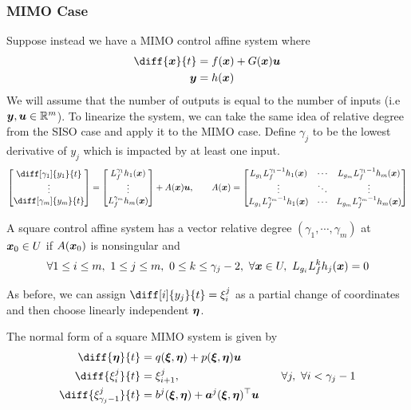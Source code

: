 \subsubsection{MIMO Case}
Suppose instead we have a MIMO control affine system where \[
	\begin{aligned}
		\diff{\bs{x}}{t} &= f(\bs{x}) + G(\bs{x})\bs{u}\\
		\bs{y} &= h(\bs{x})
	\end{aligned}
\]
We will assume that the number of outputs is equal to the number of inputs (i.e
$\boldsymbol{y}, \boldsymbol{u} \in \mathbb{R}^m$). To linearize the system, we can take the same idea
of relative degree from the SISO case and apply it to the MIMO case.
Define $\gamma_j$ to be the lowest derivative of $y_j$ which is impacted by at
least one input.\[
	\begin{bmatrix}
		\diff[\gamma_1]{y_1}{t}\\
		\vdots\\
		\diff[\gamma_m]{y_m}{t}
	\end{bmatrix}
	= \begin{bmatrix}
		L_f^{\gamma_1}h_1(\bs{x})\\
		\vdots\\
		L_f^{\gamma_m}h_m(\bs{x})\\
	\end{bmatrix} + A(\bs{x})\bs{u}, \qquad A(\bs{x}) = \begin{bmatrix}
		L_{g_1}L_f^{\gamma_1-1}h_1(\bs{x}) & \cdots &
		L_{g_m}L_f^{\gamma_1-1}h_m(\bs{x})\\
		\vdots & \ddots & \vdots\\
		L_{g_1}L_f^{\gamma_m-1}h_1(\bs{x}) & \cdots &
		L_{g_m}L_f^{\gamma_m-1}h_m(\bs{x})
	\end{bmatrix}
\]
\begin{definition}
	A square control affine system has a vector relative degree $(\gamma_1,
	\cdots, \gamma_m)$ at $\boldsymbol{x}_0\in U$ if $A(\boldsymbol{x}_0)$ is nonsingular and \[
		\forall 1\leq i\leq m,\ 1\leq j \leq m,\ 0 \leq k \leq \gamma_j-2,\ \forall
		\boldsymbol{x}\in U,\ L_{g_i}L_f^kh_j(\boldsymbol{x}) = 0
	\]
	\label{thm:vector-relative-degree}
\end{definition}
As before, we can assign $\diff[i]{y_j}{t} = \xi_i^j$ as a partial change of
coordinates and then choose linearly independent $\boldsymbol{\eta}$.
\begin{definition}
	The normal form of a square MIMO system is given by
	\[
		\begin{aligned}
			\diff{\bs{\eta}}{t} &= q(\bs{\xi},\bs{\eta}) + p(\bs{\xi}, \bs{\eta})\bs{u}\\
			\diff{\xi_i^j}{t} &= \xi_{i+1}^j, &\quad \forall j,\ \forall i < \gamma_j-1\\
			\diff{\xi_{\gamma_j-1}^j}{t} &= b^j(\bs{\xi},\bs{\eta}) +
			\bs{a}^j(\bs{\xi},\bs{\eta})^\top\bs{u}
		\end{aligned}
	\]
	\label{defn:mimo-normal-form}
\end{definition}
